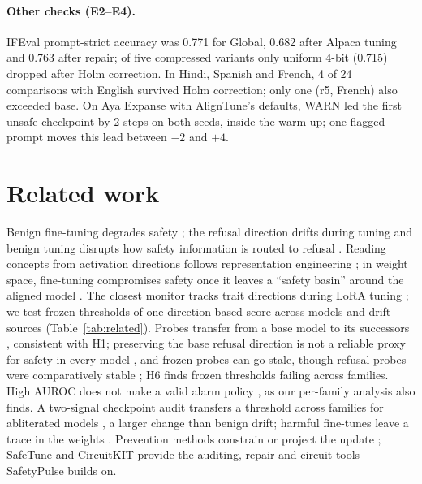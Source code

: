 \documentclass[11pt]{article}
\begin{document}


\paragraph{Other checks (E2--E4).} IFEval prompt-strict accuracy \citep{zhou2023ifeval} was 0.771 for Global, 0.682
after Alpaca tuning and 0.763 after repair; of five compressed variants only uniform 4-bit (0.715) dropped after Holm
correction. In Hindi,
Spanish and French, 4 of 24 comparisons with English survived Holm correction; only one (r5, French) also exceeded
base. On Aya Expanse with AlignTune's defaults, WARN led the first unsafe checkpoint by 2 steps on both seeds, inside
the warm-up; one flagged prompt moves this lead between $-2$ and $+4$.

\section{Related work}
\label{sec:related}

Benign fine-tuning degrades safety \citep{qi2023finetuning,he2024safedata,wei2024brittleness}; the refusal direction
\citep{arditi2024refusal} drifts during tuning \citep{du2025procon} and benign tuning disrupts how safety information is
routed to refusal \citep{guo2026routing}. Reading concepts from activation directions follows representation
engineering \citep{zou2023repe}; in weight space, fine-tuning compromises safety once it leaves a ``safety basin''
around the aligned model \citep{peng2024landscape}. The closest monitor tracks trait directions during LoRA tuning \citep{nghiem2026trait}; we test frozen thresholds of
one direction-based score across models and drift sources (Table~\ref{tab:related}). Probes transfer from a base model to its successors \citep{tsatsos2026probes}, consistent with H1; preserving the
base refusal direction is not a reliable proxy for safety in every model \citep{ruellan2026replay}, and frozen probes
can go stale, though refusal probes were comparatively stable \citep{duan2026monitors}; H6 finds frozen thresholds
failing across families.
High AUROC does not make a valid alarm policy \citep{gao2026alarm}, as our per-family analysis also finds. A two-signal checkpoint audit transfers a threshold across families for abliterated
models \citep{hurtado2026abliterated}, a larger change than benign drift; harmful fine-tunes leave a trace in
the weights \citep{bao2026trace}. Prevention methods constrain or project the update \citep{du2025procon,hsu2024safelora}; SafeTune \citep{seth2026safetune} and CircuitKIT \citep{seth2026circuitkit} provide
the auditing, repair and circuit tools SafetyPulse builds on.
\end{document}

